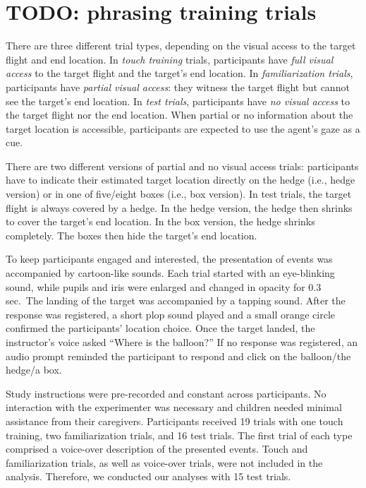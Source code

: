 \documentclass[
  english,
  man,floatsintext]{apa6}
\begin{document}
\hypertarget{todo-phrasing-training-trials}{%
\section{TODO: phrasing training trials}\label{todo-phrasing-training-trials}}

There are three different trial types, depending on the visual access to the target flight and end location. In \emph{touch training} trials, participants have \emph{full visual access} to the target flight and the target's end location. In \emph{familiarization trials}, participants have \emph{partial visual access}: they witness the target flight but cannot see the target's end location. In \emph{test trials}, participants have \emph{no visual access} to the target flight nor the end location. When partial or no information about the target location is accessible, participants are expected to use the agent's gaze as a cue.

There are two different versions of partial and no visual access trials: participants have to indicate their estimated target location directly on the hedge (i.e., hedge version) or in one of five/eight boxes (i.e., box version). In test trials, the target flight is always covered by a hedge. In the hedge version, the hedge then shrinks to cover the target's end location. In the box version, the hedge shrinks completely. The boxes then hide the target's end location.

To keep participants engaged and interested, the presentation of events was accompanied by cartoon-like sounds. Each trial started with an eye-blinking sound, while pupils and iris were enlarged and changed in opacity for 0.3 sec.~The landing of the target was accompanied by a tapping sound. After the response was registered, a short plop sound played and a small orange circle confirmed the participants' location choice. Once the target landed, the instructor's voice asked ``Where is the balloon?'' If no response was registered, an audio prompt reminded the participant to respond and click on the balloon/the hedge/a box.

Study instructions were pre-recorded and constant across participants. No interaction with the experimenter was necessary and children needed minimal assistance from their caregivers. Participants received 19 trials with one touch training, two familiarization trials,
and 16 test trials. The first trial of each type comprised a voice-over description of the presented events. Touch and familiarization trials, as well as voice-over trials, were not included in the analysis. Therefore, we conducted our analyses with 15 test trials.
\end{document}
